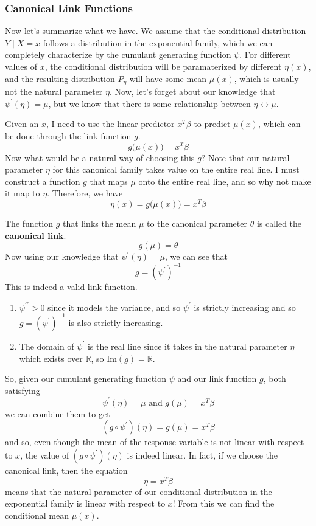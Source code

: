   \subsubsection{Canonical Link Functions}

    Now let's summarize what we have. We assume that the conditional distribution $Y \mid X = x$ follows a distribution in the exponential family, which we can completely characterize by the cumulant generating function $\psi$. For different values of $x$, the conditional distribution will be paramaterized by different $\eta (x)$, and the resulting distribution $P_\eta$ will have some mean $\mu(x)$, which is usually not the natural parameter $\eta$. Now, let's forget about our knowledge that $\psi^\prime(\eta) = \mu$, but we know that there is some relationship between $\eta \leftrightarrow \mu$.

    Given an $x$, I need to use the linear predictor $x^T \beta$ to predict $\mu(x)$, which can be done through the link function $g$. 
    \[g\big( \mu(x) \big) = x^T \beta\]
    Now what would be a natural way of choosing this $g$? Note that our natural parameter $\eta$ for this canonical family takes value on the entire real line. I must construct a function $g$ that maps $\mu$ onto the entire real line, and so why not make it map to $\eta$. Therefore, we have 
    \[\eta(x) = g\big( \mu(x) \big) = x^T \beta\]

    \begin{definition}
    The function $g$ that links the mean $\mu$ to the canonical parameter $\theta$ is called the \textbf{canonical link}. 
    \[g(\mu) = \theta\]
    Now using our knowledge that $\psi^\prime(\eta) = \mu$, we can see that 
    \[g = (\psi^\prime)^{-1}\]
    This is indeed a valid link function. 
    \begin{enumerate}
        \item $\psi^{\prime\prime} > 0$ since it models the variance, and so $\psi^\prime$ is strictly increasing and so $g = (\psi^\prime)^{-1}$ is also strictly increasing. 
        \item The domain of $\psi^\prime$ is the real line since it takes in the natural parameter $\eta$ which exists over $\mathbb{R}$, so $\mathrm{Im}(g) = \mathbb{R}$. 
    \end{enumerate}
    \end{definition}

    So, given our cumulant generating function $\psi$ and our link function $g$, both satisfying 
    \[\psi^\prime (\eta) = \mu \text{ and } g(\mu) = x^T \beta\]
    we can combine them to get 
    \[(g \circ \psi^\prime) (\eta) = g(\mu) = x^T \beta\]
    and so, even though the mean of the response variable is not linear with respect to $x$, the value of $(g \circ \psi^\prime) (\eta)$ is indeed linear. In fact, if we choose the canonical link, then the equation 
    \[\eta = x^T \beta\]
    means that the natural parameter of our conditional distribution in the exponential family is linear with respect to $x$! From this we can find the conditional mean $\mu(x)$. 

